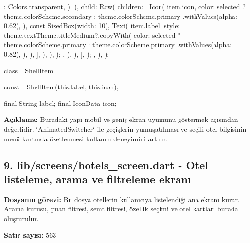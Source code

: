 \documentclass[11pt,a4paper]{article}
\begin{document}
\begin{codeblock}
{{{{                                : Colors.transparent,
                          ),
                        ),
                        child: Row(
                          children: [
                            Icon(
                              item.icon,
                              color: selected
                                  ? theme.colorScheme.secondary
                                  : theme.colorScheme.primary
                                      .withValues(alpha: 0.62),
                            ),
                            const SizedBox(width: 10),
                            Text(
                              item.label,
                              style: theme.textTheme.titleMedium?.copyWith(
                                color: selected
                                    ? theme.colorScheme.primary
                                    : theme.colorScheme.primary
                                        .withValues(alpha: 0.82),
                              ),
                            ),
                          ],
                        ),
                      ),
                    );
                  },
                ),
              ),
            ],
          );
        },
      ),
    );
  }
}

class _ShellItem {
  const _ShellItem(this.label, this.icon);

  final String label;
  final IconData icon;
}
\end{codeblock}

\textbf{Açıklama:} Buradaki yapı mobil ve geniş ekran uyumunu göstermek açısından değerlidir. `AnimatedSwitcher` ile geçişlerin yumuşatılması ve seçili otel bilgisinin menü kartında özetlenmesi kullanıcı deneyimini artırır.

\clearpage
\subsection{9. lib/screens/hotels\_screen.dart - Otel listeleme, arama ve filtreleme ekranı}
\textbf{Dosyanın görevi:} Bu dosya otellerin kullanıcıya listelendiği ana ekranı kurar. Arama kutusu, puan filtresi, semt filtresi, özellik seçimi ve otel kartları burada oluşturulur.

\textbf{Satır sayısı:} 563
\end{document}
